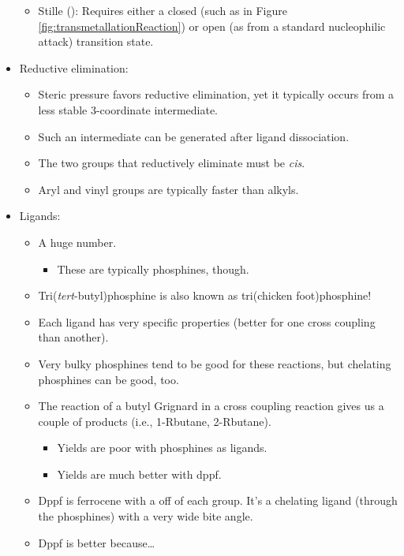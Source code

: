 \documentclass[../notes.tex]{subfiles}
\begin{document}
\begin{itemize}
\begin{itemize}
\begin{itemize}
        \end{itemize}
        \item Stille (): Requires either a closed (such as in Figure \ref{fig:transmetallationReaction}) or open (as from a standard nucleophilic attack) transition state.
    \end{itemize}
    \item Reductive elimination:
    \begin{itemize}
        \item Steric pressure favors reductive elimination, yet it typically occurs from a less stable 3-coordinate intermediate.
        \item Such an intermediate can be generated after ligand dissociation.
        \item The two groups that reductively eliminate must be \emph{cis}.
        \item Aryl and vinyl groups are typically faster than alkyls.
    \end{itemize}
    \item Ligands:
    \begin{itemize}
        \item A huge number.
        \begin{itemize}
            \item These are typically phosphines, though.
        \end{itemize}
        \item Tri(\emph{tert}-butyl)phosphine is also known as tri(chicken foot)phosphine!
        \item Each ligand has very specific properties (better for one cross coupling than another).
        \item Very bulky phosphines tend to be good for these reactions, but chelating phosphines can be good, too.
        \item The reaction of a butyl Grignard in a cross coupling reaction gives us a couple of products (i.e., 1-Rbutane, 2-Rbutane).
        \begin{itemize}
            \item Yields are poor with phosphines as  ligands.
            \item Yields are much better with dppf.
        \end{itemize}
        \item Dppf is ferrocene with a  off of each  group. It's a chelating ligand (through the phosphines) with a very wide bite angle.
        \item Dppf is better because\dots

\end{itemize}
\end{itemize}
\end{document}
